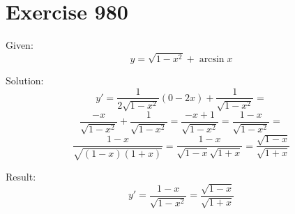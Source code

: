\documentclass[a4paper, 10pt]{scrartcl}
\begin{document}
\section{Exercise 980}

Given:
\[
y = \sqrt{1 - x^{2}} + \arcsin{x}
\]

Solution:
\[
y' = \frac{1}{2\sqrt{1 - x^{2}}}(0 - 2x) + \frac{1}{\sqrt{1 - x^{2}}} =
\]
\[
\frac{-x}{\sqrt{1 - x^{2}}} + \frac{1}{\sqrt{1 - x^{2}}} = \frac{-x + 1}{\sqrt{1 - x^{2}}} = \frac{1 - x}{\sqrt{1 - x^{2}}} =
\]
\[
\frac{1 - x}{\sqrt{(1 - x)(1 + x)}} = \frac{1 - x}{\sqrt{1 - x}\sqrt{1 + x}} = \frac{\sqrt{1 - x}}{\sqrt{1 + x}}
\]

Result:
\[
y' = \frac{1 - x}{\sqrt{1 - x^{2}}} = \frac{\sqrt{1 - x}}{\sqrt{1 + x}}
\]
\end{document}
